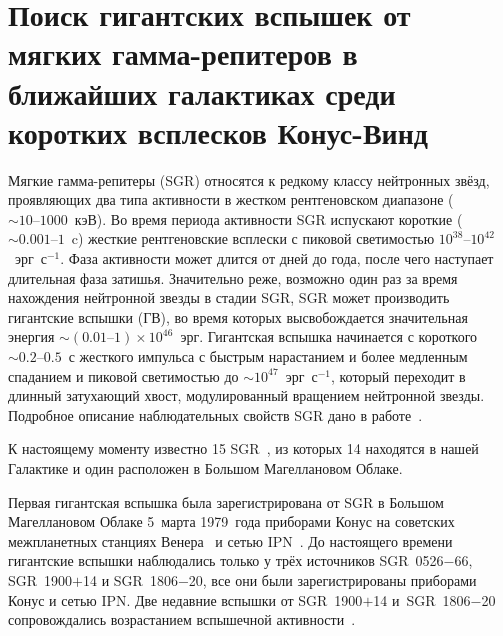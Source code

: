 \chapter{Поиск гигантских вспышек от мягких гамма-репитеров в ближайших галактиках 
         среди коротких всплесков Конус-Винд} \label{SGR_GF_search}
Мягкие гамма-репитеры (SGR) относятся к редкому классу нейтронных звёзд, проявляющих 
два типа активности в жестком рентгеновском диапазоне ($\sim 10\textrm{--}1000$~кэВ). 
Во время периода активности SGR испускают короткие ($\sim0.001\textrm{--}1$~c) жесткие рентгеновские всплески 
с пиковой светимостью $10^{38}\textrm{--}10^{42}$~эрг~с$^{-1}$. Фаза активности может длится 
от дней до года, после чего наступает длительная фаза затишья. Значительно реже, 
возможно один раз за время нахождения нейтронной звезды в стадии SGR, SGR может 
производить гигантские вспышки (ГВ), во время которых высвобождается значительная 
энергия $\sim(0.01\textrm{--}1)\times 10^{46}$~эрг. Гигантская вспышка начинается 
с короткого $\sim 0.2\textrm{--}0.5$~с жесткого импульса с быстрым нарастанием и 
более медленным спаданием и пиковой светимостью до $\sim 10^{47}$~эрг~с$^{-1}$, который переходит 
в длинный затухающий хвост, модулированный вращением нейтронной звезды. 
Подробное описание наблюдательных свойств SGR дано в работе~\citep{Mereghetti2013}.

К настоящему моменту известно 15 SGR~\citep{Olausen_Kaspi2014}, из которых 14 
находятся в нашей Галактике и один расположен в Большом Магеллановом Облаке. 

Первая гигантская вспышка была зарегистрирована от SGR в Большом Магеллановом Облаке 
5~марта 1979~года приборами Конус на советских межпланетных станциях 
Венера~\citep{Golenetskii1979SvAL, Mazets1979} 
и сетью IPN~\citep{Barat1979, Cline1980, Evans1980, Cline1982}. 
До настоящего времени гигантские вспышки наблюдались только у трёх источников 
SGR~0526$-$66, SGR~1900$+$14 и SGR~1806$-$20, все они были зарегистрированы 
приборами Конус и сетью IPN. Две недавние вспышки от SGR~1900$+$14 и~SGR~1806$-$20 
сопровождались возрастанием вспышечной активности~\citep{Mazets1999a, Frederiks2007}.

